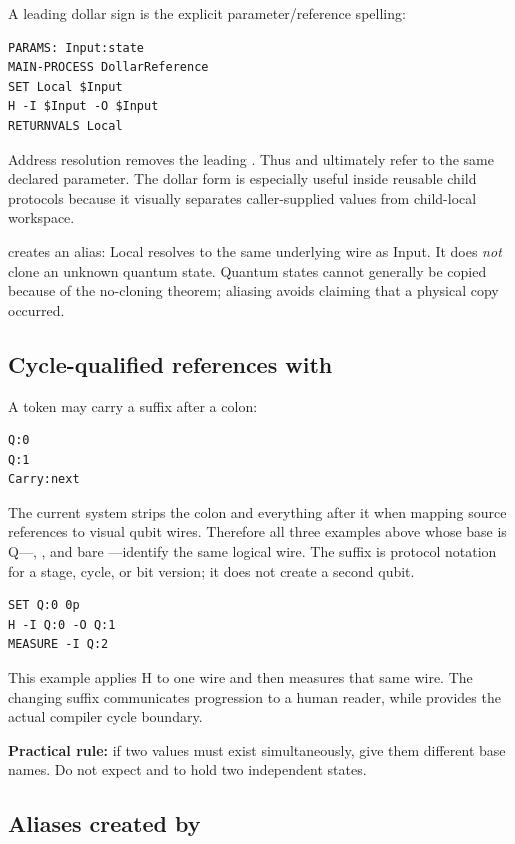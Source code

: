 A leading dollar sign is the explicit parameter/reference spelling:
\begin{lstlisting}
PARAMS: Input:state
MAIN-PROCESS DollarReference
SET Local $Input
H -I $Input -O $Input
RETURNVALS Local
\end{lstlisting}
Address resolution removes the leading \code{$}. Thus  and
 ultimately refer to the same declared parameter. The dollar
form is especially useful inside reusable child protocols because it visually
separates caller-supplied values from child-local workspace.

 creates an alias: Local resolves to the same underlying
wire as Input. It does \emph{not} clone an unknown quantum state. Quantum states
cannot generally be copied because of the no-cloning theorem; aliasing avoids
claiming that a physical copy occurred.

\subsection{Cycle-qualified references with \code{:}}

A token may carry a suffix after a colon:
\begin{lstlisting}
Q:0
Q:1
Carry:next
\end{lstlisting}
The current system strips the colon and everything after it when mapping source
references to visual qubit wires. Therefore all three examples above whose
base is Q---, , and bare ---identify the same
logical wire. The suffix is protocol notation for a stage, cycle, or bit
version; it does not create a second qubit.

\begin{lstlisting}
SET Q:0 0p
H -I Q:0 -O Q:1
MEASURE -I Q:2
\end{lstlisting}
This example applies H to one wire and then measures that same wire. The
changing suffix communicates progression to a human reader, while
 provides the actual compiler cycle boundary.

\textbf{Practical rule:} if two values must exist simultaneously, give them
different base names. Do not expect  and  to hold two
independent states.

\subsection{Aliases created by }

